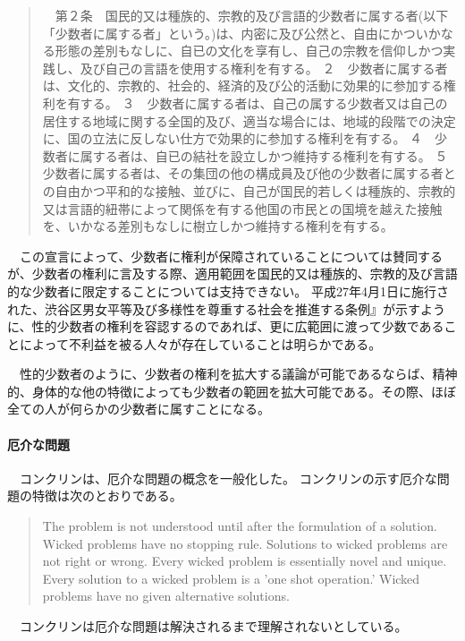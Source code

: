 \documentclass{jsarticle}
\begin{document}
\begin{quotation}
　第２条　国民的又は種族的、宗教的及び言語的少数者に属する者(以下「少数者に属する者」という。)は、内密に及び公然と、自由にかついかなる形態の差別もなしに、自已の文化を享有し、自己の宗教を信仰しかつ実践し、及び自己の言語を使用する権利を有する。
２　少数者に属する者は、文化的、宗教的、社会的、経済的及び公的活動に効果的に参加する権利を有する。
３　少数者に属する者は、自己の属する少数者又は自己の居住する地域に関する全国的及び、適当な場合には、地域的段階での決定に、国の立法に反しない仕方で効果的に参加する権利を有する。
４　少数者に属する者は、自已の結社を設立しかつ維持する権利を有する。
５　少数者に属する者は、その集団の他の構成員及び他の少数者に属する者との自由かつ平和的な接触、並びに、自己が国民的若しくは種族的、宗教的又は言語的紐帯によって関係を有する他国の市民との国境を越えた接触を、いかなる差別もなしに樹立しかつ維持する権利を有する。
\end{quotation}
　この宣言によって、少数者に権利が保障されていることについては賛同するが、少数者の権利に言及する際、適用範囲を国民的又は種族的、宗教的及び言語的な少数者に限定することについては支持できない。
平成27年4月1日に施行された、渋谷区男女平等及び多様性を尊重する社会を推進する条例』\cite{shibuya}が示すように、性的少数者の権利を容認するのであれば、更に広範囲に渡って少数であることによって不利益を被る人々が存在していることは明らかである。

　性的少数者のように、少数者の権利を拡大する議論が可能であるならば、精神的、身体的な他の特徴によっても少数者の範囲を拡大可能である。その際、ほぼ全ての人が何らかの少数者に属すことになる。

\paragraph*{厄介な問題}

　コンクリンは、厄介な問題の概念を一般化した\cite{Conklin}。 コンクリンの示す厄介な問題の特徴は次のとおりである。
\begin{quotation}

The problem is not understood until after the formulation of a solution.
Wicked problems have no stopping rule.
Solutions to wicked problems are not right or wrong.
Every wicked problem is essentially novel and unique.
Every solution to a wicked problem is a 'one shot operation.'
Wicked problems have no given alternative solutions.

\end{quotation}
　コンクリンは厄介な問題は解決されるまで理解されないとしている。
\end{document}
